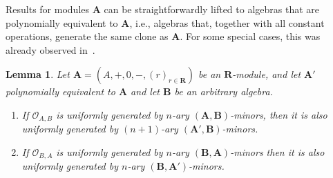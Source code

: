 \documentclass[11pt]{amsart}
\theoremstyle{plain}
\newtheorem{lemma}[thm]{Lemma}
\theoremstyle{definition}
\newcommand{\alg}[1]{\mathbf{#1}}
\newcommand{\clonoid}[1]{\mathcal{#1}}
\newcommand{\clodO}{\clonoid{O}}
\newcommand{\algA}{\alg{A}}
\newcommand{\algB}{\alg{B}}
\newcommand{\algR}{\alg{R}}
\renewcommand\vec{\mathbf}
\newcommand{\vx}{\vec{x}}
\begin{document}






Results for modules $\algA$ can be straightforwardly lifted to algebras that are polynomially equivalent to $\algA$, i.e., algebras that, together with all constant operations, generate the same clone as $\algA$. For some special cases, this was already observed in~\cite[Theorem 4.1.]{MW-clonoidsmodules}.

\begin{lemma}\label{lem:unifgenforpolyequiv}
Let $\algA = (A,+,0,-,(r)_{r\in \algR})$ be an $\algR$-module, and let $\algA'$ polynomially equivalent to $\alg A$ and let $\algB$ be an arbitrary algebra.
\begin{enumerate}
\item\label{ite:lem:unifgenforpolyequiv1} If $\clodO_{A,B}$ is uniformly generated by $n$-ary $(\algA, \algB)$-minors, then it is also uniformly generated by $(n+1)$-ary $(\algA', \algB)$-minors.
\item\label{ite:lem:unifgenforpolyequiv2} If $\clodO_{B,A}$ is uniformly generated by $n$-ary $(\algB, \algA)$-minors then it is also uniformly generated by $n$-ary $(\algB,\algA')$-minors.
\end{enumerate}
\end{lemma}
\end{document}
